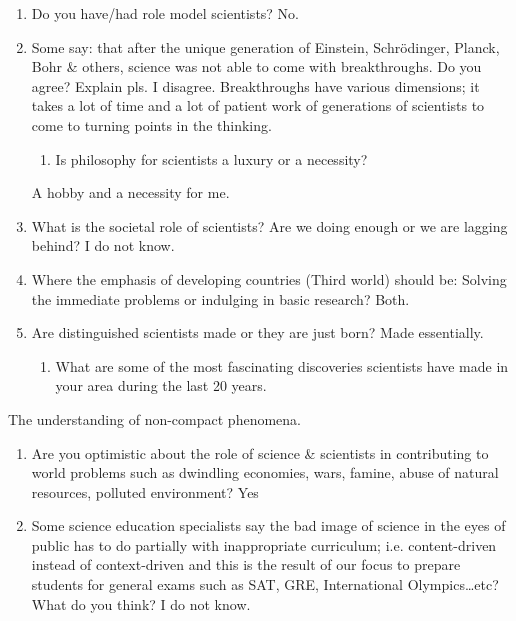 \documentclass[11pt]{article}
\begin{document}
\begin{itemize}
\begin{enumerate}
\begin{enumerate}
\item Do you have/had role model scientists?
No.

\item Some say: that after the unique generation of Einstein, Schrödinger, Planck, Bohr \& others, science was not able to come with breakthroughs.  Do you agree?  Explain pls.
I disagree. Breakthroughs have various dimensions; it takes a lot of time and a lot of patient work of generations of scientists to come to turning points in the thinking.

\begin{enumerate}
\item Is philosophy for scientists a luxury or a necessity?
\end{enumerate}
A hobby and a necessity for me.

\item What is the societal role of scientists?  Are we doing enough or we are lagging behind?
I do not know.

\item Where the emphasis of developing countries (Third world) should be: Solving the immediate problems or indulging in basic research?
Both.

\item Are distinguished scientists made or they are just born?
Made essentially.

\begin{enumerate}
\item What are some of the most fascinating discoveries scientists have made in your area during the last 20 years.
\end{enumerate}
\end{enumerate}
The understanding of non-compact phenomena.

\begin{enumerate}
\item Are you optimistic about the role of science \& scientists in contributing to world problems such as dwindling economies, wars, famine, abuse of natural resources, polluted environment?
Yes

\item Some science education specialists say the bad image of science in the eyes of public has to do partially with inappropriate curriculum; i.e. content-driven instead of context-driven and this is the result of our focus to prepare students for general exams such as SAT, GRE, International Olympics…etc?  What do you think?
I do not know.
\end{enumerate}
\end{enumerate}
\end{itemize}
\end{document}
